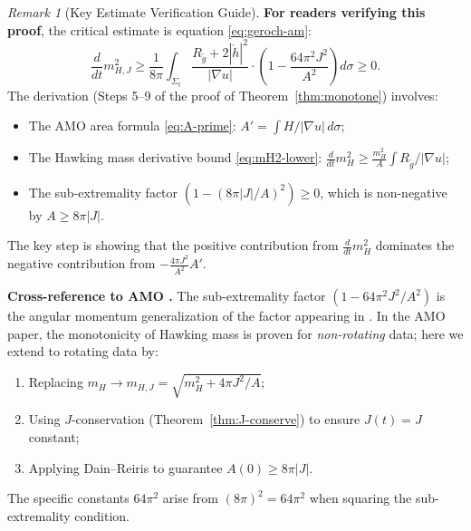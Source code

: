 \documentclass[12pt]{article}
\theoremstyle{plain}
\theoremstyle{definition}
\theoremstyle{remark}
\newtheorem{remark}[theorem]{Remark}
\newcommand{\tg}{\tilde{g}}
\begin{document}
\begin{remark}[Key Estimate Verification Guide]\label{rem:verification-mono}
\textbf{For readers verifying this proof}, the critical estimate is equation \eqref{eq:geroch-am}:
\[
\frac{d}{dt}m_{H,J}^2 \geq \frac{1}{8\pi}\int_{\Sigma_t} \frac{R_{\tg} + 2|\mathring{h}|^2}{|\nabla u|} \cdot \left(1 - \frac{64\pi^2 J^2}{A^2}\right) d\sigma \geq 0.
\]
The derivation (Steps 5--9 of the proof of Theorem~\ref{thm:monotone}) involves:
\begin{itemize}
    \item The AMO area formula \eqref{eq:A-prime}: $A' = \int H/|\nabla u| \, d\sigma$;
    \item The Hawking mass derivative bound \eqref{eq:mH2-lower}: $\frac{d}{dt}m_H^2 \geq \frac{m_H^2}{A}\int R_{\tg}/|\nabla u|$;
    \item The sub-extremality factor $(1 - (8\pi|J|/A)^2) \geq 0$, which is non-negative by $A \geq 8\pi|J|$.
\end{itemize}
The key step is showing that the positive contribution from $\frac{d}{dt}m_H^2$ dominates the negative contribution from $-\frac{4\pi J^2}{A^2}A'$.

\textbf{Cross-reference to AMO \cite{amo2022}.} The sub-extremality factor $(1 - 64\pi^2 J^2/A^2)$ is the angular momentum generalization of the factor appearing in \cite[Theorem~4.1]{amo2022}. In the AMO paper, the monotonicity of Hawking mass is proven for \emph{non-rotating} data; here we extend to rotating data by:
\begin{enumerate}
    \item[(i)] Replacing $m_H \to m_{H,J} = \sqrt{m_H^2 + 4\pi J^2/A}$;
    \item[(ii)] Using $J$-conservation (Theorem~\ref{thm:J-conserve}) to ensure $J(t) = J$ constant;
    \item[(iii)] Applying Dain--Reiris \cite{dain2011} to guarantee $A(0) \geq 8\pi|J|$.
\end{enumerate}
The specific constants $64\pi^2$ arise from $(8\pi)^2 = 64\pi^2$ when squaring the sub-extremality condition.
\end{remark}
\end{document}
